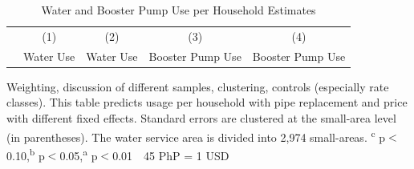 \documentclass[12pt,table]{article}
\newcommand{\regtext}{
Standard errors are clustered at the small-area level (in parentheses).  The water service area is divided into 2,974 small-areas.
\textsuperscript{c} p$<$0.10,\textsuperscript{b} p$<$0.05,\textsuperscript{a} p$<$0.01 \,\,
}
\begin{document}
\begin{table}[h!] 
\centering
\caption{Water and Booster Pump Use per Household Estimates}\label{table:mainregshet}
\vspace{-2mm}
\begin{threeparttable}
\begin{tabular}{@{}l*{1}{CCCC}@{}}
\toprule
  & (1)       & (2)  & (3) & (4)            \\
  & Water Use & Water Use  & Booster Pump Use & Booster Pump Use \\
\midrule

\bottomrule
\end{tabular}
\begin{tablenotes}
\footnotesize
\item Weighting, discussion of different samples, clustering, controls (especially rate classes).  This table predicts usage per household with pipe replacement and price with different fixed effects.   \regtext 45 PhP = 1 USD \,\,
\end{tablenotes}
\end{threeparttable}
\end{table}



{
\small
\nocite{*}


}



%  

%    



%
\end{document}
